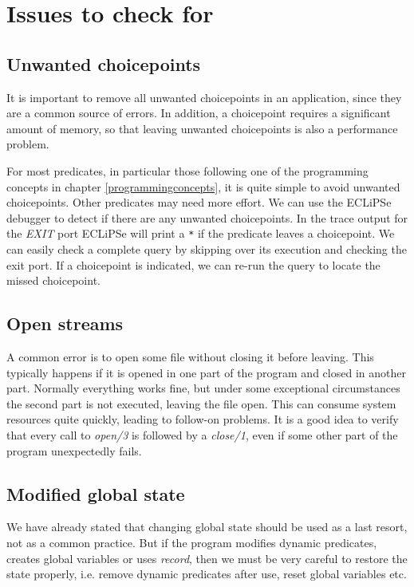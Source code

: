 \documentclass[a4paper,12pt]{report}
\begin{document}
\section{Issues to check for}
\subsection{Unwanted choicepoints}
It is important to remove all unwanted choicepoints in an application, since they are a common source of errors. In addition, a choicepoint requires a significant amount of memory, so that leaving unwanted choicepoints is also a performance problem.

For most predicates, in particular those following one of the programming concepts in chapter \ref{programmingconcepts}, it is quite simple to avoid unwanted choicepoints. Other predicates may need more effort. We can use the ECLiPSe debugger to detect if there are any unwanted choicepoints. In the trace output for the {\it EXIT} port ECLiPSe will print a \verb+*+ if the predicate leaves a choicepoint. We can easily check a complete query by skipping over its execution and checking the exit port. If a choicepoint is indicated, we can re-run the query to locate the missed choicepoint. 

\subsection{Open streams}
A common error is to open some file without closing it before leaving. This typically happens if it is opened in one part of the program and closed in another part. Normally everything works fine, but under some exceptional circumstances the second part is not executed, leaving the file open. This can consume system resources quite quickly, leading to follow-on problems. It is a good idea to verify that every call to {\it open/3} is followed by a {\it close/1}, even if some other part of the program unexpectedly fails.

\subsection{Modified global state}
We have already stated that changing global state should be used as a last resort, not as a common practice. But if the program modifies dynamic predicates, creates global variables or uses {\it record}, then we must be very careful to restore the state properly, i.e. remove dynamic predicates after use, reset global variables etc.
\end{document}
